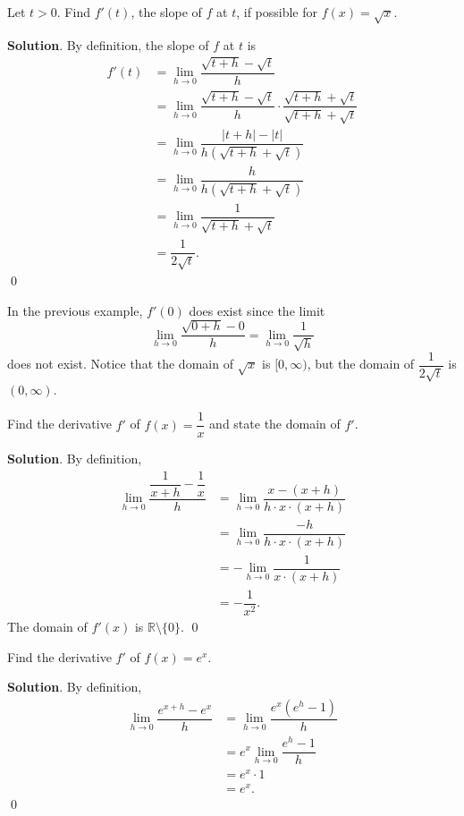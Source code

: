 \documentclass[11pt]{book}
\theoremstyle{break}
\theoremstyle{no_label}
\newcommand{\bbR}{\mathbb{R}}
\numberwithin{equation}{section}
\begin{document}
\begin{example}
    Let $t>0$. Find $f'(t)$, the slope of $f$ at $t$, if possible for $f(x)=\sqrt{x}$.
\end{example}
\textbf{Solution}. By definition, the slope of $f$ at $t$ is \begin{align*}
    f'(t)&=\lim_{h\to 0}\dfrac{\sqrt{t+h}-\sqrt{t}}{h}\\
    &=\lim_{h\to 0}\dfrac{\sqrt{t+h}-\sqrt{t}}{h}\cdot\dfrac{\sqrt{t+h}+\sqrt{t}}{\sqrt{t+h}+\sqrt{t}}\\
    &=\lim_{h\to 0}\dfrac{|t+h|-|t|}{h(\sqrt{t+h}+\sqrt{t})}\\
    &=\lim_{h\to 0}\dfrac{h}{h(\sqrt{t+h}+\sqrt{t})}\\
    &=\lim_{h\to 0}\dfrac{1}{\sqrt{t+h}+\sqrt{t}}\\
    &=\dfrac{1}{2\sqrt{t}}.
\end{align*} \qed

\begin{remark}
    In the previous example, $f'(0)$ does exist since the limit $$\lim_{h\to 0}\dfrac{\sqrt{0+h}-0}{h}=\lim_{h\to 0}\dfrac{1}{\sqrt{h}}$$ does not exist. Notice that the domain of $\sqrt{x}$ is $[0, \infty)$, but the domain of $\dfrac{1}{2\sqrt{t}}$ is $(0, \infty)$.
\end{remark}

\begin{example}
    Find the derivative $f'$ of $f(x)=\dfrac{1}{x}$ and state the domain of $f'$.
\end{example}
\textbf{Solution}. By definition, \begin{align*}
    \lim_{h\to 0}\dfrac{\dfrac{1}{x+h}-\dfrac{1}{x}}{h}&=\lim_{h\to 0}\dfrac{x-(x+h)}{h\cdot x\cdot(x+h)}\\
    &=\lim_{h\to 0}\dfrac{-h}{h\cdot x\cdot (x+h)}\\
    &=-\lim_{h\to 0}\dfrac{1}{x\cdot(x+h)}\\
    &=-\dfrac{1}{x^2}.
\end{align*} The domain of $f'(x)$ is $\bbR\setminus\{0\}$. \qed

\begin{example}
    Find the derivative $f'$ of $f(x)=e^x$.
\end{example}
\textbf{Solution}. By definition, \begin{align*}
    \lim_{h\to 0}\dfrac{e^{x+h}-e^x}{h}&=\lim_{h\to 0}\dfrac{e^x(e^h-1)}{h}\\
    &=e^x\lim_{h\to 0}\dfrac{e^h-1}{h}\\
    &=e^x\cdot 1\\
    &=e^x.
\end{align*} \qed
\end{document}
